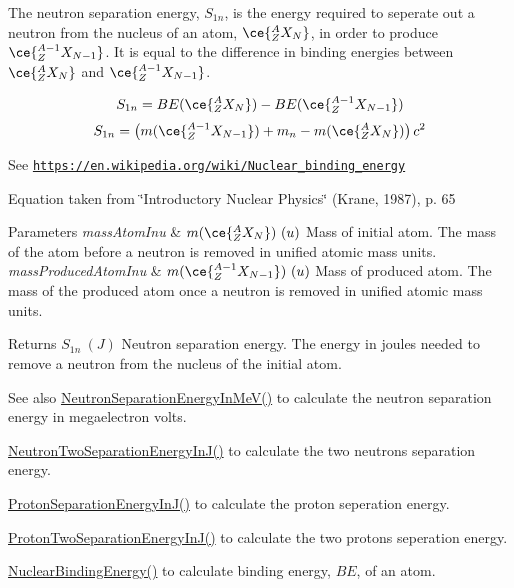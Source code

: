The neutron separation energy, $S_{1n}$, is the energy required to seperate out a neutron from the nucleus of an atom, $\ce{ ^{A}_{Z}X_{N} }$, in order to produce $\ce{ ^{A-1}_{Z}X_{N-1} }$. It is equal to the difference in binding energies between $\ce{ ^{A}_{Z}X_{N} }$ and $\ce{ ^{A-1}_{Z}X_{N-1} }$.

\[S_{1n} = BE(\ce{ ^{A}_{Z}X_{N} }) - BE(\ce{ ^{A-1}_{Z}X_{N-1} })\] \[S_{1n} = \left ( m(\ce{ ^{A-1}_{Z}X_{N-1} }) + m_n - m(\ce{ ^{A}_{Z}X_{N} }) \right ) c^2\]

See \href{https://en.wikipedia.org/wiki/Nuclear_binding_energy}{\tt https\+://en.\+wikipedia.\+org/wiki/\+Nuclear\+\_\+binding\+\_\+energy}

Equation taken from \char`\"{}\+Introductory Nuclear Physics\char`\"{} (Krane, 1987), p. 65


\begin{DoxyParams}{Parameters}
{\em mass\+Atom\+Inu} & $m(\ce{ ^{A}_{Z}X_{N} })\ (u)$ Mass of initial atom. The mass of the atom before a neutron is removed in unified atomic mass units. \\
\hline
{\em mass\+Produced\+Atom\+Inu} & $m(\ce{ ^{A-1}_{Z}X_{N-1} })\ (u)$ Mass of produced atom. The mass of the produced atom once a neutron is removed in unified atomic mass units. \\
\hline
\end{DoxyParams}
\begin{DoxyReturn}{Returns}
$S_{1n}\ (J)$ Neutron separation energy. The energy in joules needed to remove a neutron from the nucleus of the initial atom. 
\end{DoxyReturn}
\begin{DoxySeeAlso}{See also}
\mbox{\hyperlink{group___e_g_x_phys-_nuclear_separation_energy_ga66133edb5809c81dd9fd60e09ebbef79}{Neutron\+Separation\+Energy\+In\+Me\+V()}} to calculate the neutron separation energy in megaelectron volts. 

\mbox{\hyperlink{group___e_g_x_phys-_nuclear_separation_energy_ga293ac9428420a0adf4235048dbe529b4}{Neutron\+Two\+Separation\+Energy\+In\+J()}} to calculate the two neutrons separation energy. 

\mbox{\hyperlink{group___e_g_x_phys-_nuclear_separation_energy_ga4274d8f5a3860169fd81970707eb582a}{Proton\+Separation\+Energy\+In\+J()}} to calculate the proton seperation energy. 

\mbox{\hyperlink{group___e_g_x_phys-_nuclear_separation_energy_gad7c1d4a32daa8aaa53c5fce37c421f82}{Proton\+Two\+Separation\+Energy\+In\+J()}} to calculate the two protons seperation energy. 

\mbox{\hyperlink{group___e_g_x_phys-_nuclear_binding_energy_gab6832bf15ead7b4e867e759e0a2a078e}{Nuclear\+Binding\+Energy()}} to calculate binding energy, $BE$, of an atom. 
\end{DoxySeeAlso}
\mbox{\label{group___e_g_x_phys-_nuclear_separation_energy_ga66133edb5809c81dd9fd60e09ebbef79}} 
